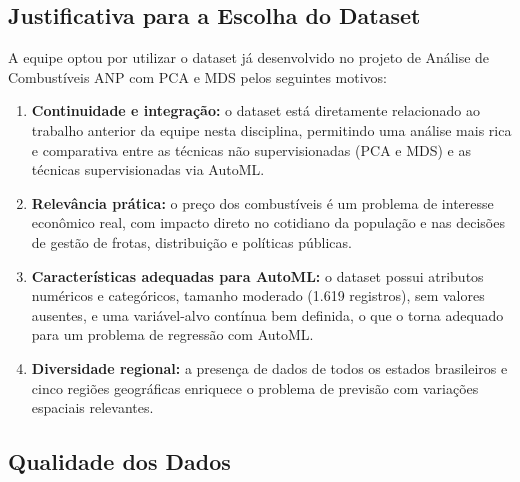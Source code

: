 \documentclass[11pt, a4paper, oneside]{article}
\begin{document}
\subsection{Justificativa para a Escolha do Dataset}
\label{sec:dataset-justificativa}

A equipe optou por utilizar o dataset já desenvolvido no projeto de Análise de
Combustíveis ANP com PCA e MDS pelos seguintes motivos:

\begin{enumerate}[leftmargin=1.5cm, itemsep=4pt]
  \item \textbf{Continuidade e integração:} o dataset está diretamente relacionado ao trabalho anterior da equipe nesta disciplina, permitindo uma análise mais rica e comparativa entre as técnicas não supervisionadas (PCA e MDS) e as técnicas supervisionadas via AutoML.
  \item \textbf{Relevância prática:} o preço dos combustíveis é um problema de interesse econômico real, com impacto direto no cotidiano da população e nas decisões de gestão de frotas, distribuição e políticas públicas.
  \item \textbf{Características adequadas para AutoML:} o dataset possui atributos numéricos e categóricos, tamanho moderado (1.619 registros), sem valores ausentes, e uma variável-alvo contínua bem definida, o que o torna adequado para um problema de regressão com AutoML.
  \item \textbf{Diversidade regional:} a presença de dados de todos os estados brasileiros e cinco regiões geográficas enriquece o problema de previsão com variações espaciais relevantes.
\end{enumerate}

\subsection{Qualidade dos Dados}
\label{sec:dataset-qualidade}
\end{document}

